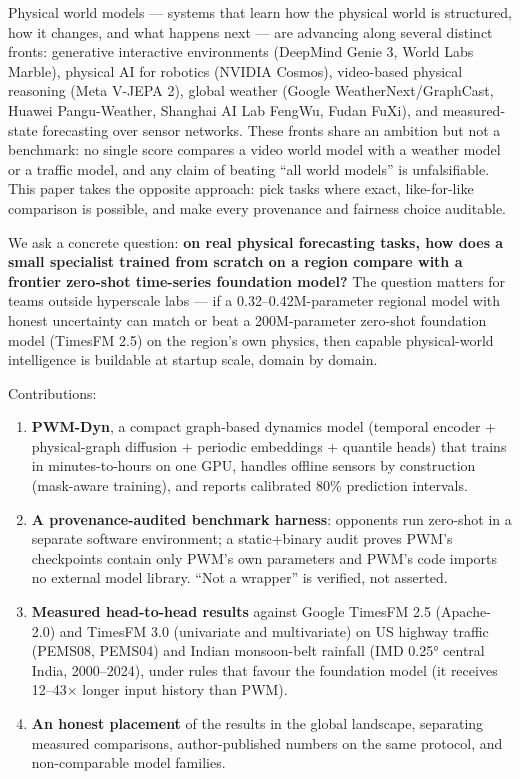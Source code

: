 \documentclass[
  10pt,
]{article}
\providecommand{\tightlist}{%
  \setlength{\itemsep}{0pt}\setlength{\parskip}{0pt}}
\begin{document}
Physical world models --- systems that learn how the physical world is
structured, how it changes, and what happens next --- are advancing
along several distinct fronts: generative interactive environments
(DeepMind Genie 3, World Labs Marble), physical AI for robotics (NVIDIA
Cosmos), video-based physical reasoning (Meta V-JEPA 2), global weather
(Google WeatherNext/GraphCast, Huawei Pangu-Weather, Shanghai AI Lab
FengWu, Fudan FuXi), and measured-state forecasting over sensor
networks. These fronts share an ambition but not a benchmark: no single
score compares a video world model with a weather model or a traffic
model, and any claim of beating ``all world models'' is unfalsifiable.
This paper takes the opposite approach: pick tasks where exact,
like-for-like comparison is possible, and make every provenance and
fairness choice auditable.

We ask a concrete question: \textbf{on real physical forecasting tasks,
how does a small specialist trained from scratch on a region compare
with a frontier zero-shot time-series foundation model?} The question
matters for teams outside hyperscale labs --- if a 0.32--0.42M-parameter
regional model with honest uncertainty can match or beat a
200M-parameter zero-shot foundation model (TimesFM 2.5) on the region's own
physics, then capable physical-world intelligence is buildable at
startup scale, domain by domain.

Contributions:

\begin{enumerate}
\def\labelenumi{\arabic{enumi}.}
\tightlist
\item
  \textbf{PWM-Dyn}, a compact graph-based dynamics model (temporal
  encoder + physical-graph diffusion + periodic embeddings + quantile
  heads) that trains in minutes-to-hours on one GPU, handles offline
  sensors by construction (mask-aware training), and reports calibrated
  80\% prediction intervals.
\item
  \textbf{A provenance-audited benchmark harness}: opponents run
  zero-shot in a separate software environment; a static+binary audit
  proves PWM's checkpoints contain only PWM's own parameters and PWM's
  code imports no external model library. ``Not a wrapper'' is verified,
  not asserted.
\item
  \textbf{Measured head-to-head results} against Google TimesFM 2.5
  (Apache-2.0) and TimesFM 3.0 (univariate and multivariate) on US
  highway traffic (PEMS08, PEMS04) and Indian monsoon-belt rainfall (IMD
  0.25° central India, 2000--2024), under rules that favour the
  foundation model (it receives 12--43× longer input history than PWM).
\item
  \textbf{An honest placement} of the results in the global landscape,
  separating measured comparisons, author-published numbers on the same
  protocol, and non-comparable model families.
\end{enumerate}
\end{document}
